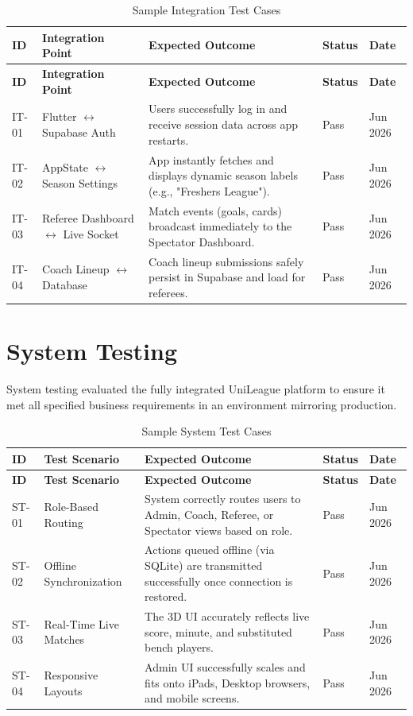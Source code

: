 \documentclass[12pt,a4paper]{article}
\begin{document}
\begin{longtable}{p{1cm}p{4.5cm}p{5cm}p{2cm}p{2cm}}
\caption{Sample Integration Test Cases} \\
\toprule
\textbf{ID} & \textbf{Integration Point} & \textbf{Expected Outcome} & \textbf{Status} & \textbf{Date} \\
\midrule
\endfirsthead
\toprule
\textbf{ID} & \textbf{Integration Point} & \textbf{Expected Outcome} & \textbf{Status} & \textbf{Date} \\
\midrule
\endhead
IT-01 & Flutter $\leftrightarrow$ Supabase Auth & Users successfully log in and receive session data across app restarts. & Pass & Jun 2026 \\
IT-02 & AppState $\leftrightarrow$ Season Settings & App instantly fetches and displays dynamic season labels (e.g., "Freshers League"). & Pass & Jun 2026 \\
IT-03 & Referee Dashboard $\leftrightarrow$ Live Socket & Match events (goals, cards) broadcast immediately to the Spectator Dashboard. & Pass & Jun 2026 \\
IT-04 & Coach Lineup $\leftrightarrow$ Database & Coach lineup submissions safely persist in Supabase and load for referees. & Pass & Jun 2026 \\
\bottomrule
\end{longtable}

\section{System Testing}
System testing evaluated the fully integrated UniLeague platform to ensure it met all specified business requirements in an environment mirroring production.

\begin{longtable}{p{1cm}p{4.5cm}p{5cm}p{2cm}p{2cm}}
\caption{Sample System Test Cases} \\
\toprule
\textbf{ID} & \textbf{Test Scenario} & \textbf{Expected Outcome} & \textbf{Status} & \textbf{Date} \\
\midrule
\endfirsthead
\toprule
\textbf{ID} & \textbf{Test Scenario} & \textbf{Expected Outcome} & \textbf{Status} & \textbf{Date} \\
\midrule
\endhead
ST-01 & Role-Based Routing & System correctly routes users to Admin, Coach, Referee, or Spectator views based on role. & Pass & Jun 2026 \\
ST-02 & Offline Synchronization & Actions queued offline (via SQLite) are transmitted successfully once connection is restored. & Pass & Jun 2026 \\
ST-03 & Real-Time Live Matches & The 3D UI accurately reflects live score, minute, and substituted bench players. & Pass & Jun 2026 \\
ST-04 & Responsive Layouts & Admin UI successfully scales and fits onto iPads, Desktop browsers, and mobile screens. & Pass & Jun 2026 \\
\bottomrule
\end{longtable}
\end{document}
